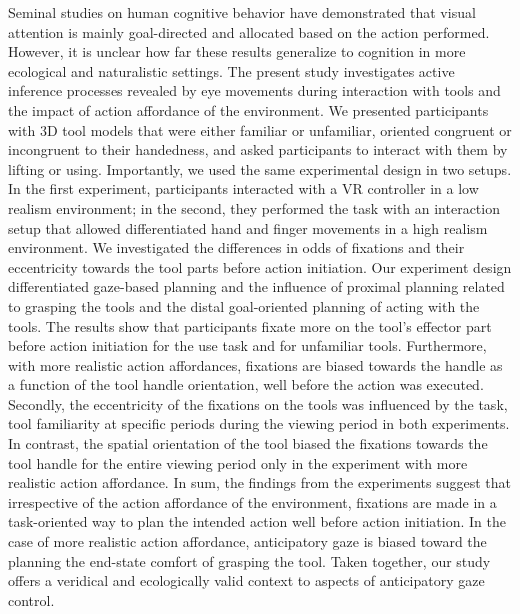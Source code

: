 Seminal studies on human cognitive behavior have demonstrated that visual attention is mainly goal-directed and allocated based on the action performed. However, it is unclear how far these results generalize to cognition in more ecological and naturalistic settings. The present study investigates active inference processes revealed by eye movements during interaction with tools and the impact of action affordance of the environment. 
We presented participants with 3D tool models that were either familiar or unfamiliar, oriented congruent or incongruent to their handedness, and asked participants to interact with them by lifting or using. Importantly, we used the same experimental design in two setups. In the first experiment, participants interacted with a VR controller in a low realism environment; in the second, they performed the task with an interaction setup that allowed differentiated hand and finger movements in a high realism environment. We investigated the differences in odds of fixations and their eccentricity towards the tool parts before action initiation. Our experiment design differentiated gaze-based planning and the influence of proximal planning related to grasping the tools and the distal goal-oriented planning of acting with the tools.
The results show that participants fixate more on the tool’s effector part before action initiation for the use task and for unfamiliar tools. Furthermore, with more realistic action affordances, fixations are biased towards the handle as a function of the tool handle orientation, well before the action was executed. Secondly, the eccentricity of the fixations on the tools was influenced by the task, tool familiarity at specific periods during the viewing period in both experiments. In contrast, the spatial orientation of the tool biased the fixations towards the tool handle for the entire viewing period only in the experiment with more realistic action affordance. 
In sum, the findings from the experiments suggest that irrespective of the action affordance of the environment, fixations are made in a task-oriented way to plan the intended action well before action initiation. In the case of more realistic action affordance, anticipatory gaze is biased toward the planning the end-state comfort of grasping the tool. Taken together, our study offers a veridical and ecologically valid context to aspects of anticipatory gaze control.

